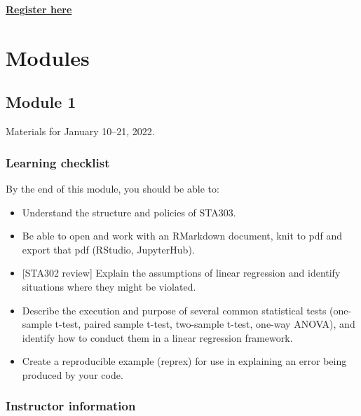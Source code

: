 \documentclass[
  openany]{book}
\providecommand{\tightlist}{%
  \setlength{\itemsep}{0pt}\setlength{\parskip}{0pt}}
\newenvironment{yellowbox}{
  \definecolor{shadecolor}{rgb}{254,187,67}  %
  \color{black}
  \begin{shaded}}
 {\end{shaded}}
\begin{document}
\href{https://forms.office.com/pages/responsepage.aspx?id=JsKqeAMvTUuQN7RtVsVSEKx69ygcj5RNkthLmVGb1A5UNkJUQlRYNFhUTTVPRThRMVJINTVSRE1ZVi4u}{\textbf{Register here}}

\hypertarget{part-modules}{%
\part*{Modules}\label{part-modules}}

\hypertarget{m1}{%
\chapter{Module 1}\label{m1}}

\begin{yellowbox}
Materials for January 10--21, 2022.

\end{yellowbox}

\hypertarget{learning-checklist}{%
\section{Learning checklist}\label{learning-checklist}}

By the end of this module, you should be able to:

\begin{itemize}
\tightlist
\item
  Understand the structure and policies of STA303.\\
\item
  Be able to open and work with an RMarkdown document, knit to pdf and export that pdf (RStudio, JupyterHub).
\item
  {[}STA302 review{]} Explain the assumptions of linear regression and identify situations where they might be violated.\\
\item
  Describe the execution and purpose of several common statistical tests (one-sample t-test, paired sample t-test, two-sample t-test, one-way ANOVA), and identify how to conduct them in a linear regression framework.\\
\item
  Create a reproducible example (reprex) for use in explaining an error being produced by your code.
\end{itemize}

\hypertarget{instructor-information}{%
\section{Instructor information}\label{instructor-information}}
\end{document}
